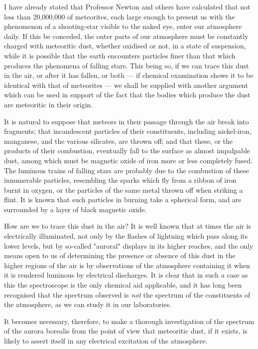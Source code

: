 \documentclass[a4paper, 12pt, oneside, polutonikogreek, english]{article}
\begin{document}
I have already stated that Professor Newton and others have calculated that not less than 20,000,000 of meteorites, each large enough to present us with the phenomenon of a shooting-star visible to the naked eye, enter our atmosphere daily. If this be conceded, the outer parts of our atmosphere must be constantly charged with meteoritic dust, whether oxidised or not, in a state of suspension, while it is possible that the earth encounters particles finer than that which produces the phenomena of falling stars. This being so, if we can trace this dust in the air, or after it has fallen, or both --- if chemical examination shows it to be identical with that of meteorites --- we shall be supplied with another argument which can be used in support of the fact that the bodies which produce the dust are meteoritic in their origin.

It is natural to suppose that meteors in their passage through the air break into fragments; that incandescent particles of their constituents, including nickel-iron, manganese, and the various silicates, are thrown off; and that these, or the products of their combustion, eventually fall to the surface as almost impalpable dust, among which must be magnetic oxide of iron more or less completely fused. The luminous trains of falling stars are probably due to the combustion of these innumerable particles, resembling the sparks which fly from a ribbon of iron burnt in oxygen, or the particles of the same metal thrown off when striking a flint. It is known that such particles in burning take a spherical form, and are surrounded by a layer of black magnetic oxide.

How are we to trace this dust in the air? It is well known that at times the air is electrically illuminated, not only by the flashes of lightning which pass along its lower levels, but by so-called "auroral" displays in its higher reaches, and the only means open to us of determining the presence or absence of this dust in the higher regions of the air is by observations of the atmosphere containing it when it is rendered luminous by electrical discharges. It is clear that in such a case as this the spectroscope is the only chemical aid applicable, and it has long been recognised that the spectrum observed is \emph{not} the spectrum of the constituents of the atmosphere, as we can study it in our laboratories.

It becomes necessary, therefore, to make a thorough investigation of the spectrum of the aurora borealis from the point of view that meteoritic dust, if it exists, is likely to assert itself in any electrical excitation of the atmosphere.
\end{document}
